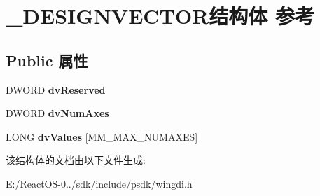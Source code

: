 \hypertarget{struct___d_e_s_i_g_n_v_e_c_t_o_r}{}\section{\+\_\+\+D\+E\+S\+I\+G\+N\+V\+E\+C\+T\+O\+R结构体 参考}
\label{struct___d_e_s_i_g_n_v_e_c_t_o_r}
\subsection*{Public 属性}
\begin{DoxyCompactItemize}
\item 
\mbox{\label{struct___d_e_s_i_g_n_v_e_c_t_o_r_ab740869ab2c95307b6dda65d93462cbc}} 
D\+W\+O\+RD {\bfseries dv\+Reserved}
\item 
\mbox{\label{struct___d_e_s_i_g_n_v_e_c_t_o_r_a3ce533bcb92a542ed9c66cb4510b56f1}} 
D\+W\+O\+RD {\bfseries dv\+Num\+Axes}
\item 
\mbox{\label{struct___d_e_s_i_g_n_v_e_c_t_o_r_a1bbfb3c6045e6dcd554bbd3d319f868e}} 
L\+O\+NG {\bfseries dv\+Values} \mbox{[}M\+M\+\_\+\+M\+A\+X\+\_\+\+N\+U\+M\+A\+X\+ES\mbox{]}
\end{DoxyCompactItemize}


该结构体的文档由以下文件生成\+:\begin{DoxyCompactItemize}
\item 
E\+:/\+React\+O\+S-\/0../sdk/include/psdk/wingdi.\+h\end{DoxyCompactItemize}
